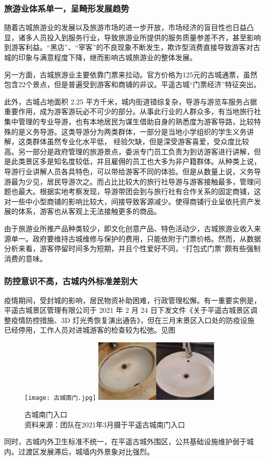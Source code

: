 \documentclass[UTF8]{ctexart}
\begin{document}
        \subsubsection{旅游业体系单一，呈畸形发展趋势}

    随着古城旅游业的发展以及旅游市场的进一步开放，市场经济的盲目性也日益凸显，诸多人员投入到服务行业，导致旅游业所提供的服务质量参差不齐，甚至影响到游客利益。“黑店”、“宰客”的不良现象不断发生，欺诈型消费直接导致游客对古城的印象与满意程度下降，继而影响古城旅游业的整体发展。

    另一方面，古城旅游业主要依靠门票来拉动。官方价格为125元的古城通票，虽然包含22个景点，但是普遍受到游客和商铺的非议。平遥古城“门票经济”特征突出。

    此外，古城占地面积 2.25 平方千米，城内街道错综复杂，导游与游览车服务占据重要作用，成为游客游玩必不可少的部分。从事此行业的人群众多，有当地旅行社集中管理的专业导游，也有本地居民为谋生借助自身的熟悉度为游客导路，比较特殊的是义务导游。这类导游分为两类群体，一部分是当地小学组织的学生义务讲解，这类群体虽然专业化水平低， 经验欠缺，但是深受游客喜爱，受众度比较高。另一部分是政府管理的旅游景点，委派专门员工负责为到访游客进行讲解，但是此类景区多是知名度较低，并且雇佣的员工也大多为非户籍群体。从种类上说，导游行业讲解人员各具特色，可以带给游客不同的体验。但是从数量上说，义务导游最为少见，居民导游次之。而占比比较大的旅行社导游与游客接触最多，管理问题也最大。根据实地考察发现，导游带团会到与旅行社有合作关系的固定商铺，这对一些中小型商铺的影响比较大，间接导致客源减少。使得商铺行业呈依托资产发展的体系，游客也从客观上无法接触更多的商品。

    由于旅游业所推产品种类较少，即文化创意产品、特色活动少，古城旅游业收入来源单一。政府要维持古城维修与保护的费用，只能依附于门票价格。然而，从数据分析来看，游客停留时间多为短期，并且个性爱好不同，“打包式门票”颇有些强制消费的意味。

        \subsubsection{防控意识不高，古城内外标准差别大}

    疫情期间，受封城的影响，居民物资补助困难，行政管理松懈。有一重要实例是，平遥古城景区管理有限公司于 2021 年 2 月 24 日下发文件《关于平遥古城景区调整疫情防控措施、3D 灯光秀恢复演出通告》，但在三月末景区入口处的防疫设施已经停用，工作人员对进城游客的检查较为松弛。见图
\begin{figure}[H]
    \centering
    \texttt{[image: 古城南门.jpg]}
    \includegraphics[width=6cm]{洗脸盆.jpg}
    \caption[plain]{古城南门入口\\资料来源：团队在2021年3月摄于平遥古城南门入口}
    \label{fig:my_label}
\end{figure}
同时，古城内外卫生标准不统一，在平遥古城外围区，公共基础设施维护弱于城内。过渡区发展滞后，城墙内外景象对比强烈。
\end{document}
